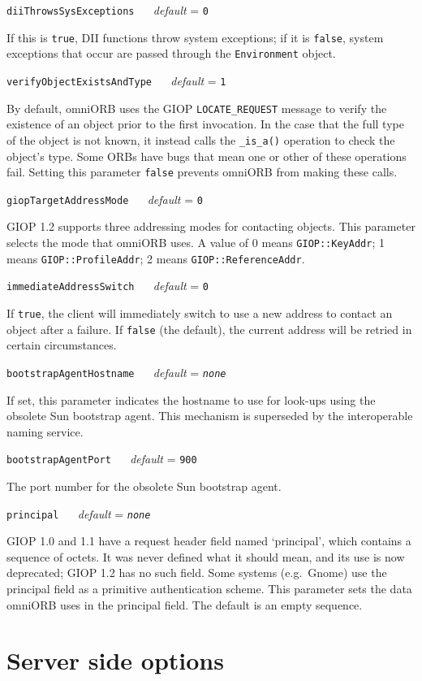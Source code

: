 \documentclass[11pt,twoside,a4paper]{book}
\makeatletter
\newcommand{\type}[1]{\texttt{#1}}
\newcommand{\code}[1]{\texttt{#1}}
\newcommand{\op}[1]{\texttt{#1()}}
\newcommand{\confopt}[2]
  {\vspace{\baselineskip}\par\noindent\code{#1} ~~ \textit{default} =
   \code{#2}}
\renewcommand{\confopt}[2]
  {\vspace{\baselineskip}\par\noindent\code{#1} ~~ \textit{default} =
   \code{#2}\\[-1ex]\@afterheading}
\makeatother
\begin{document}
\confopt{diiThrowsSysExceptions}{0}

If this is \code{true}, DII functions throw system exceptions; if it
is \code{false}, system exceptions that occur are passed through the
\type{Environment} object.


\confopt{verifyObjectExistsAndType}{1}

By default, omniORB uses the GIOP \code{LOCATE\_REQUEST} message to
verify the existence of an object prior to the first invocation. In
the case that the full type of the object is not known, it instead
calls the \op{\_is\_a} operation to check the object's type. Some ORBs
have bugs that mean one or other of these operations fail. Setting
this parameter \code{false} prevents omniORB from making these calls.


\confopt{giopTargetAddressMode}{0}

GIOP 1.2 supports three addressing modes for contacting objects. This
parameter selects the mode that omniORB uses. A value of 0 means
\code{GIOP::KeyAddr}; 1 means \code{GIOP::ProfileAddr}; 2 means
\code{GIOP::ReferenceAddr}.


\confopt{immediateAddressSwitch}{0}

If \code{true}, the client will immediately switch to use a new
address to contact an object after a failure. If \code{false} (the
default), the current address will be retried in certain
circumstances.


\confopt{bootstrapAgentHostname}{\textit{none}}

If set, this parameter indicates the hostname to use for look-ups
using the obsolete Sun bootstrap agent. This mechanism is superseded
by the interoperable naming service.


\confopt{bootstrapAgentPort}{900}

The port number for the obsolete Sun bootstrap agent.


\confopt{principal}{\textit{none}}

GIOP 1.0 and 1.1 have a request header field named `principal', which
contains a sequence of octets. It was never defined what it should
mean, and its use is now deprecated; GIOP 1.2 has no such field. Some
systems (e.g.\ Gnome) use the principal field as a primitive
authentication scheme. This parameter sets the data omniORB uses in
the principal field. The default is an empty sequence.



\section{Server side options}
\end{document}
